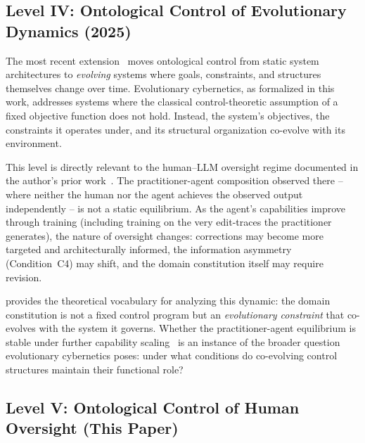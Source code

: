 \documentclass[11pt]{article}
\begin{document}
\subsection{Level IV: Ontological Control of Evolutionary Dynamics (2025)}
\label{sec:level4}

The most recent extension~\citep{palagin2025evolutionary} moves ontological control from static system architectures to \emph{evolving} systems where goals, constraints, and structures themselves change over time.
Evolutionary cybernetics, as formalized in this work, addresses systems where the classical control-theoretic assumption of a fixed objective function does not hold.
Instead, the system's objectives, the constraints it operates under, and its structural organization co-evolve with its environment.

This level is directly relevant to the human--LLM oversight regime documented in the author's prior work~\citep{ovcharov2025citation,ovcharov2025statute}.
The practitioner-agent composition observed there -- where neither the human nor the agent achieves the observed output independently -- is not a static equilibrium.
As the agent's capabilities improve through training (including training on the very edit-traces the practitioner generates), the nature of oversight changes: corrections may become more targeted and architecturally informed, the information asymmetry (Condition~C4) may shift, and the domain constitution itself may require revision.

\citet{palagin2025evolutionary} provides the theoretical vocabulary for analyzing this dynamic: the domain constitution is not a fixed control program but an \emph{evolutionary constraint} that co-evolves with the system it governs.
Whether the practitioner-agent equilibrium is stable under further capability scaling~\citep{burns2023weak} is an instance of the broader question evolutionary cybernetics poses: under what conditions do co-evolving control structures maintain their functional role?

\subsection{Level V: Ontological Control of Human Oversight (This Paper)}
\label{sec:level5}
\end{document}
